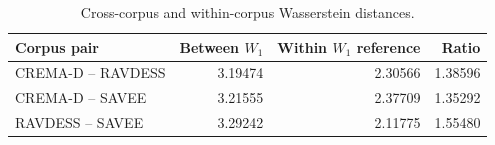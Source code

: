 \begin{table}[ht]
    \centering
    \small
    \caption{Cross-corpus and within-corpus Wasserstein distances.}
    \label{tab:e0_wasserstein}
    \begin{tabular}{lrrr}
        \toprule
        Corpus pair & Between $W_1$ & Within $W_1$ reference & Ratio \\
        \midrule
        CREMA-D -- RAVDESS & 3.19474 & 2.30566 & 1.38596 \\
        CREMA-D -- SAVEE & 3.21555 & 2.37709 & 1.35292 \\
        RAVDESS -- SAVEE & 3.29242 & 2.11775 & 1.55480 \\
        \bottomrule
    \end{tabular}
\end{table}
